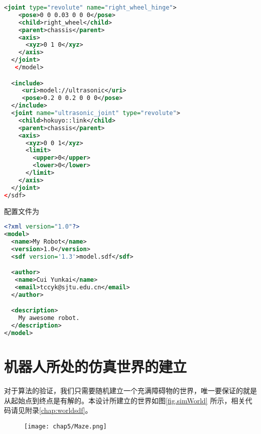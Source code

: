 \begin{lstlisting}[language={XML}, caption={机器人模型描述文件}]
  <joint type="revolute" name="right_wheel_hinge">
    <pose>0 0 0.03 0 0 0</pose>
    <child>right_wheel</child>
    <parent>chassis</parent>
    <axis>
      <xyz>0 1 0</xyz>
    </axis>
  </joint>
   </model>

  <include>
     <uri>model://ultrasonic</uri>
     <pose>0.2 0 0.2 0 0 0</pose>
  </include>
  <joint name="ultrasonic_joint" type="revolute">
    <child>hokuyo::link</child>
    <parent>chassis</parent>
    <axis>
      <xyz>0 0 1</xyz>
      <limit>
        <upper>0</upper>
        <lower>0</lower>
      </limit>
    </axis>
  </joint>  
</sdf>
\end{lstlisting}
配置文件为 \\
\begin{lstlisting}[language={XML}, caption={机器人模型配置文件}]
<?xml version="1.0"?>
<model>
  <name>My Robot</name>
  <version>1.0</version>
  <sdf version='1.3'>model.sdf</sdf>

  <author>
   <name>Cui Yunkai</name>
   <email>tccyk@sjtu.edu.cn</email>
  </author>

  <description>
    My awesome robot.
  </description>
</model>
\end{lstlisting}
\section{机器人所处的仿真世界的建立}
对于算法的验证，我们只需要随机建立一个充满障碍物的世界，唯一要保证的就是从起始点到终点是有解的。本设计所建立的世界如图\ref{fig.simWorld} 所示，相关代码请见附录\ref{chap:worldsdf}。
\begin{figure}[!htp]
  \centering
  \texttt{[image: chap5/Maze.png]}
\end{figure}

